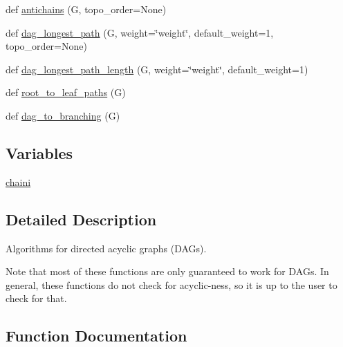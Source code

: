 \begin{DoxyCompactItemize}
\item 
def \hyperlink{namespacenetworkx_1_1algorithms_1_1dag_a269f94d57f2a7ef7559754d4f6d8032d}{antichains} (G, topo\+\_\+order=None)
\item 
def \hyperlink{namespacenetworkx_1_1algorithms_1_1dag_abbfb030d483ff43f5f7da173db47ee4a}{dag\+\_\+longest\+\_\+path} (G, weight=\char`\"{}weight\char`\"{}, default\+\_\+weight=1, topo\+\_\+order=None)
\item 
def \hyperlink{namespacenetworkx_1_1algorithms_1_1dag_aa5cb4d4b25d9d700fe878ddf4044ed72}{dag\+\_\+longest\+\_\+path\+\_\+length} (G, weight=\char`\"{}weight\char`\"{}, default\+\_\+weight=1)
\item 
def \hyperlink{namespacenetworkx_1_1algorithms_1_1dag_aa6432469cf28a68ed889941626729667}{root\+\_\+to\+\_\+leaf\+\_\+paths} (G)
\item 
def \hyperlink{namespacenetworkx_1_1algorithms_1_1dag_ac63ef5d8c287a81f02cc897e51cc662f}{dag\+\_\+to\+\_\+branching} (G)
\end{DoxyCompactItemize}
\subsection*{Variables}
\begin{DoxyCompactItemize}
\item 
\hyperlink{namespacenetworkx_1_1algorithms_1_1dag_ae9077dab1fc86c2cf208bff64fd4d594}{chaini}
\end{DoxyCompactItemize}


\subsection{Detailed Description}
\begin{DoxyVerb}Algorithms for directed acyclic graphs (DAGs).

Note that most of these functions are only guaranteed to work for DAGs.
In general, these functions do not check for acyclic-ness, so it is up
to the user to check for that.
\end{DoxyVerb}
 

\subsection{Function Documentation}
\mbox{\label{namespacenetworkx_1_1algorithms_1_1dag_a074659844f762889735522a3da549efa}} 
